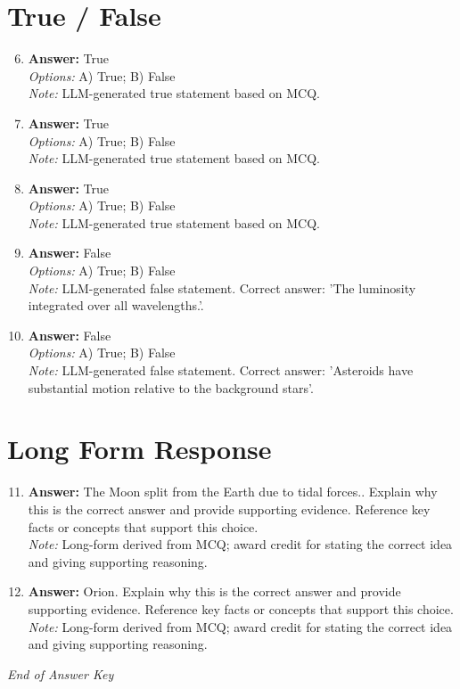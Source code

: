 \documentclass[12pt]{article}
\begin{document}
\section*{True / False}
\begin{enumerate}[label=\arabic*.]
\setcounter{enumi}{5}
\item \textbf{Answer:} True
\\ \textit{Options:} A) True; B) False
\\ \textit{Note:} LLM-generated true statement based on MCQ.
\item \textbf{Answer:} True
\\ \textit{Options:} A) True; B) False
\\ \textit{Note:} LLM-generated true statement based on MCQ.
\item \textbf{Answer:} True
\\ \textit{Options:} A) True; B) False
\\ \textit{Note:} LLM-generated true statement based on MCQ.
\item \textbf{Answer:} False
\\ \textit{Options:} A) True; B) False
\\ \textit{Note:} LLM-generated false statement. Correct answer: 'The luminosity integrated over all wavelengths.'.
\item \textbf{Answer:} False
\\ \textit{Options:} A) True; B) False
\\ \textit{Note:} LLM-generated false statement. Correct answer: 'Asteroids have substantial motion relative to the background stars'.
\end{enumerate}

\section*{Long Form Response}
\begin{enumerate}[label=\arabic*.]
\setcounter{enumi}{10}
\item \textbf{Answer:} The Moon split from the Earth due to tidal forces.. Explain why this is the correct answer and provide supporting evidence. Reference key facts or concepts that support this choice.
\\ \textit{Note:} Long-form derived from MCQ; award credit for stating the correct idea and giving supporting reasoning.
\item \textbf{Answer:} Orion. Explain why this is the correct answer and provide supporting evidence. Reference key facts or concepts that support this choice.
\\ \textit{Note:} Long-form derived from MCQ; award credit for stating the correct idea and giving supporting reasoning.
\end{enumerate}

\vfill
\noindent\textit{End of Answer Key}
\end{document}
